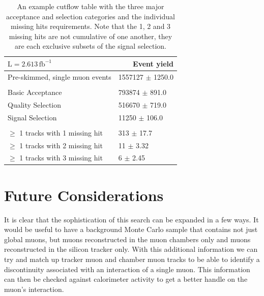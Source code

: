 \documentclass[a4paper,12pt]{article}
\begin{document}
    \begin{table}[htbp] 
    \begin{center} 
    \begin{tabular}{ll}
    $\mathrm{L} = 2.613\,\mathrm{fb}^{-1}$                                                                                                                                                                                                     & \multicolumn{1}{r}{Event yield}   \\ 
    \hline 
    Pre-skimmed, single muon events           & 1557127 $\pm$ 1250.0              \\ 
    \\
    Basic Acceptance                          & 793874 $\pm$ 891.0                \\
    Quality Selection                         & 516670 $\pm$ 719.0                \\
    Signal Selection                          & 11250 $\pm$ 106.0                 \\
    \\
    $\geq$ 1 tracks with 1 missing hit        & 313 $\pm$ 17.7                    \\ 
    $\geq$ 1 tracks with 2 missing hit        & 11 $\pm$ 3.32                    \\ 
    $\geq$ 1 tracks with 3 missing hit        & 6 $\pm$ 2.45                    \\ 

    \hline 
    \end{tabular} 
    \end{center} 
    \caption{An example cutflow table with the three major acceptance and
    selection categories and the individual missing hits requirements. Note that
    the 1, 2 and 3 missing hits are not cumulative of one another, they are each 
    exclusive subsets of the signal selection.}
    \end{table} 

\section{Future Considerations}

    It is clear that the sophistication of this search can be expanded in a few
    ways. It would be useful to have a background Monte Carlo sample that
    contains not just global muons, but muons reconstructed in the muon chambers
    only and muons reconstructed in the silicon tracker only. With this
    additional information we can try and match up tracker muon and chamber muon
    tracks to be able to identify a discontinuity associated with an interaction
    of a single muon. This information can then be checked against calorimeter
    activity to get a better handle on the muon's interaction.
\end{document}

